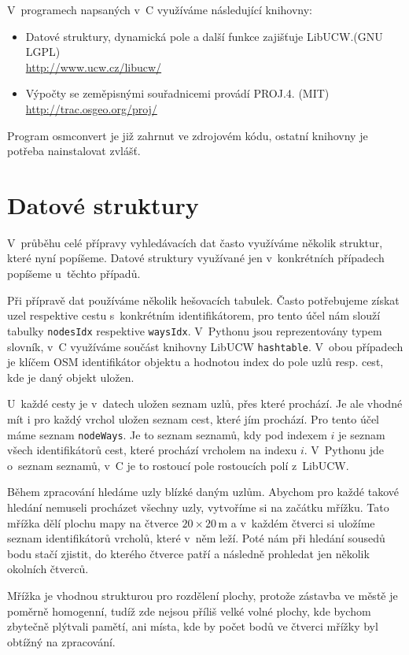 \noindent V~programech napsaných v~C využíváme následující knihovny:
\begin{itemize}
	\item Datové struktury, dynamická pole a další funkce zajišťuje
	{\tuc LibUCW}.(GNU LGPL)\\
	\url{http://www.ucw.cz/libucw/}
	\item Výpočty se zeměpisnými souřadnicemi provádí {\tuc PROJ.4}. (MIT)\\
	\url{http://trac.osgeo.org/proj/}
\end{itemize}

Program osmconvert je již zahrnut ve zdrojovém kódu, ostatní knihovny je
potřeba nainstalovat zvlášť.

\section{Datové struktury}
V~průběhu celé přípravy vyhledávacích dat často využíváme několik struktur,
které nyní popíšeme. Datové struktury využívané jen v~konkrétních případech
popíšeme u~těchto případů.

Při přípravě dat používáme několik {\tuc hešovacích tabulek}. Často potřebujeme
získat uzel respektive cestu s~konkrétním identifikátorem, pro tento účel nám
slouží tabulky \verb|nodesIdx| respektive \verb|waysIdx|. V~Pythonu jsou
reprezentovány typem slovník, v~C využíváme součást knihovny LibUCW
\verb|hashtable|. V~obou případech je klíčem OSM identifikátor objektu a
hodnotou index do pole uzlů resp. cest, kde je daný objekt uložen.

U~každé cesty je v~datech uložen seznam uzlů, přes které prochází. Je ale vhodné
mít i pro každý vrchol uložen seznam cest, které jím prochází. Pro tento účel
máme seznam \verb|nodeWays|. Je to seznam seznamů, kdy pod indexem $i$ je seznam
všech identifikátorů cest, které prochází vrcholem na indexu $i$. V~Pythonu jde
o~seznam seznamů, v~C je to rostoucí pole rostoucích polí z~LibUCW.

Během zpracování hledáme uzly blízké daným uzlům. Abychom pro každé takové
hledání nemuseli procházet všechny uzly, vytvoříme si na začátku {\tuc mřížku}.
Tato mřížka dělí plochu mapy na čtverce $20 \times 20$\,m a v~každém čtverci si
uložíme seznam identifikátorů vrcholů, které v~něm leží. Poté nám při hledání
sousedů bodu stačí zjistit, do kterého čtverce patří a následně prohledat jen
několik okolních čtverců.

Mřížka je vhodnou strukturou pro rozdělení plochy, protože zástavba ve městě je
poměrně homogenní, tudíž zde nejsou příliš velké volné plochy, kde bychom
zbytečně plýtvali pamětí, ani místa, kde by počet bodů ve čtverci mřížky byl
obtížný na zpracování.

